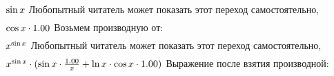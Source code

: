 \begin{math}
\sin x \\
\end{math}
Любопытный читатель может показать этот переход самостоятельно, 
\begin{gather}
\end{gather}
\begin{math}
\cos x \cdot 1.00 \\
\end{math}
Возьмем производную от: 
\begin{gather}
\end{gather}
\begin{math}
x ^ {\sin x }\\
\end{math}
Любопытный читатель может показать этот переход самостоятельно, 
\begin{gather}
\end{gather}
\begin{math}
x ^ {\sin x }\cdot (\sin x \cdot \frac {1.00 }{x }+ \ln x \cdot \cos x \cdot 1.00 )\\
\end{math}
Выражение после взятия производной:

